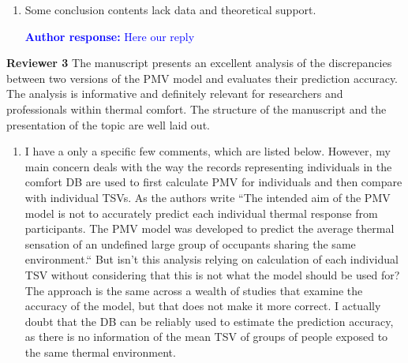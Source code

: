 \documentclass[a4paper, 10pt]{letter}
\newcommand{\response}[1]{\textcolor{blue}{\textbf{Author response:} #1}}
\begin{document}
\begin{letter}
\begin{enumerate}
            \item Some conclusion contents lack data and theoretical support.

            \response{Here our reply}

        \end{enumerate}

        \clearpage

        \textbf{Reviewer 3}
        The manuscript presents an excellent analysis of the discrepancies between two versions of the PMV model and evaluates their prediction accuracy.
        The analysis is informative and definitely relevant for researchers and professionals within thermal comfort.
        The structure of the manuscript and the presentation of the topic are well laid out.

        \begin{enumerate}
            \item I have a only a specific few comments, which are listed below.
            However, my main concern deals with the way the records representing individuals in the comfort DB are used to first calculate PMV for individuals and then compare with individual TSVs.
            As the authors write ``The intended aim of the PMV model is not to accurately predict each individual thermal response from participants.
            The PMV model was developed to predict the average thermal sensation of an undefined large group of occupants sharing the same environment.``
            But isn't this analysis relying on calculation of each individual TSV without considering that this is not what the model should be used for?
            The approach is the same across a wealth of studies that examine the accuracy of the model, but that does not make it more correct.
            I actually doubt that the DB can be reliably used to estimate the prediction accuracy, as there is no information of the mean TSV of groups of people exposed to the same thermal environment.


\end{enumerate}
\end{letter}
\end{document}
